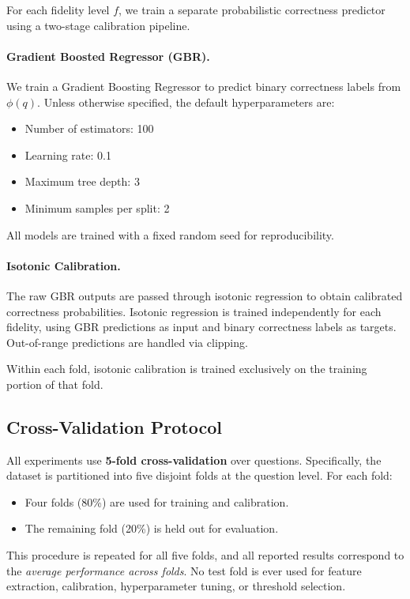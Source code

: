 For each fidelity level $f$, we train a separate probabilistic correctness predictor using a two-stage calibration pipeline.

\paragraph{Gradient Boosted Regressor (GBR).}
We train a Gradient Boosting Regressor to predict binary correctness labels from $\phi(q)$.
Unless otherwise specified, the default hyperparameters are:
\begin{itemize}
    \item Number of estimators: 100
    \item Learning rate: 0.1
    \item Maximum tree depth: 3
    \item Minimum samples per split: 2
\end{itemize}
All models are trained with a fixed random seed for reproducibility.

\paragraph{Isotonic Calibration.}
The raw GBR outputs are passed through isotonic regression to obtain calibrated correctness probabilities.
Isotonic regression is trained independently for each fidelity, using GBR predictions as input and binary correctness labels as targets.
Out-of-range predictions are handled via clipping.

Within each fold, isotonic calibration is trained exclusively on the training portion of that fold.

\subsection{Cross-Validation Protocol}
\label{sec:cross_validation}

All experiments use \textbf{5-fold cross-validation} over questions.
Specifically, the dataset is partitioned into five disjoint folds at the question level.
For each fold:
\begin{itemize}
    \item Four folds (80\%) are used for training and calibration.
    \item The remaining fold (20\%) is held out for evaluation.
\end{itemize}

This procedure is repeated for all five folds, and all reported results correspond to the \emph{average performance across folds}.
No test fold is ever used for feature extraction, calibration, hyperparameter tuning, or threshold selection.

